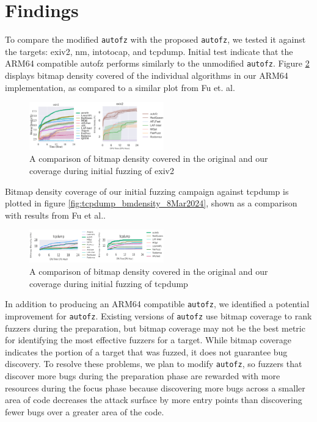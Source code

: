 \section{Findings}

To compare the  modified \texttt{autofz} with the proposed \texttt{autofz}, we tested it against the 
targets: exiv2, nm, intotocap, and tcpdump. Initial test indicate that the ARM64 compatible 
autofz performs similarly to the unmodified \texttt{autofz}. Figure \ref{fig:exiv2_compare_orig_arm64} 
displays bitmap density covered of the individual algorithms in our ARM64 implementation, 
as compared to a similar plot from Fu et. al\cite{fu_autofz_2023}.

\begin{figure}
    \includegraphics[width=0.52\textwidth]{figs/exiv2_compare_orig_arm64.png}
    \centering
    \caption{A comparison of bitmap density covered in the original\cite{fu_autofz_2023} and our 
    coverage during initial fuzzing of exiv2}
    \label{fig:exiv2_compare_orig_arm64}
\end{figure}

Bitmap density coverage of our initial fuzzing campaign against tcpdump is plotted 
in figure \ref{fig:tcpdump_bmdensity_8Mar2024}, shown as a comparison with results 
from Fu et al.\cite{fu_autofz_2023}.

\begin{figure}
    \includegraphics[width=0.52\textwidth]{figs/tcp_compare_orig_arm64.png}
    \centering
    \caption{A comparison of bitmap density covered in the original\cite{fu_autofz_2023} and our 
    coverage during initial fuzzing of tcpdump}
    \label{fig:exiv2_compare_orig_arm64}
\end{figure}

In addition to producing an ARM64 compatible \texttt{autofz}, we identified a potential improvement for \texttt{autofz}.
Existing versions of \texttt{autofz} use bitmap coverage to rank fuzzers during the preparation, but bitmap
coverage may not be the best metric for identifying the most effective fuzzers for a target. While
bitmap coverage indicates the portion of a target that was fuzzed, it does not guarantee bug discovery.
To resolve these problems, we plan to modify \texttt{autofz}, so fuzzers that discover more bugs during the
preparation phase are rewarded with more resources during the focus phase because discovering more bugs
across a smaller area of code decreases the attack surface by more entry points than discovering fewer
bugs over a greater area of the code.